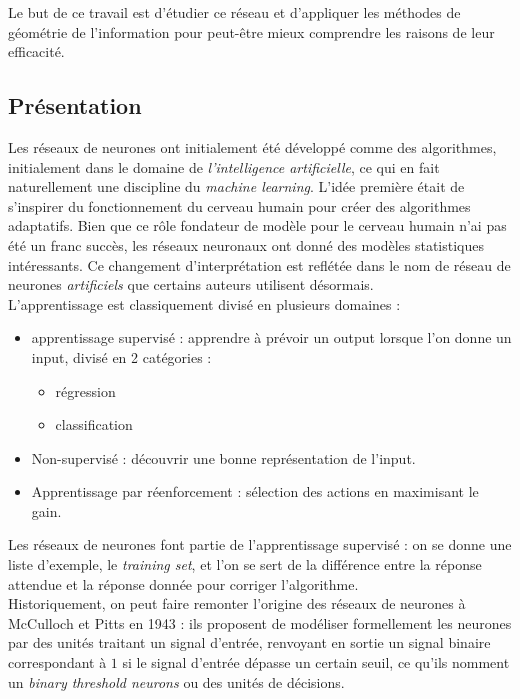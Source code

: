\documentclass{article}
\theoremstyle{definition}
\begin{document}
Le but de ce travail est d'étudier ce réseau et d'appliquer les méthodes de géométrie de l'information pour peut-être mieux comprendre les raisons de leur efficacité.%
\subsection{Présentation}

Les réseaux de neurones ont initialement été développé comme des algorithmes, initialement dans le domaine de \textit{l'intelligence artificielle}, ce qui en fait naturellement une discipline du \textit{machine learning}. L'idée première était de s'inspirer du fonctionnement du cerveau humain pour créer des algorithmes adaptatifs. Bien que ce rôle fondateur de modèle pour le cerveau humain n'ai pas été un franc succès, les réseaux neuronaux ont donné des modèles statistiques intéressants. Ce changement d'interprétation est reflétée dans le nom de réseau de neurones \textit{artificiels} que certains auteurs utilisent désormais. \\

L'apprentissage est classiquement divisé en plusieurs domaines :
\begin{itemize}
\item apprentissage supervisé : apprendre à prévoir un output lorsque l'on donne un input, divisé en 2 catégories :
\begin{itemize}
\item régression 
\item classification
\end{itemize}
\item Non-supervisé : découvrir une bonne représentation de l'input.
\item Apprentissage par réenforcement : sélection des actions en maximisant le gain.\\
\end{itemize}
Les réseaux de neurones font partie de l'apprentissage supervisé : on se donne une liste d'exemple, le \textit{training set}, et l'on se sert de la différence entre la réponse attendue et la réponse donnée pour corriger l'algorithme.\\

Historiquement, on peut faire remonter l'origine des réseaux de neurones à McCulloch et Pitts en 1943 : ils proposent de modéliser formellement les neurones par des unités traitant un signal d'entrée, renvoyant en sortie un signal binaire correspondant à $1$ si le signal d'entrée dépasse un certain seuil, ce qu'ils nomment un \textit{binary threshold neurons} ou des unités de décisions.\\
\end{document}
